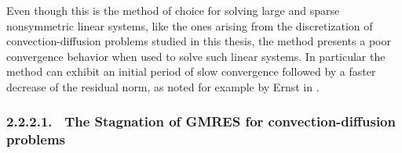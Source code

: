 Even though this is the method of choice for solving large and sparse nonsymmetric linear systems, like the ones arising from the discretization of convection-diffusion problems studied in this thesis, the method presents a poor convergence behavior when used to solve such linear systems. In particular the method can exhibit an initial period of slow convergence followed by a faster decrease of the residual norm, as noted for example by Ernst in \cite{Ern00}.

\subsubsection{2.2.2.1. \ The Stagnation of GMRES for convection-diffusion problems}
\label{back:itersolvers:krylov:stagnation}

%
%

